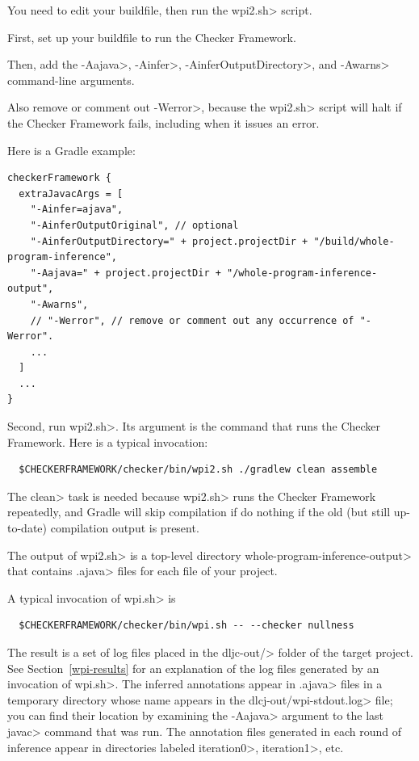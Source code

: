 You need to edit your buildfile, then run the \<wpi2.sh> script.



First, set up your buildfile to run the Checker Framework.

Then, add the
\<-Aajava>,
\<-Ainfer>,
\<-AinferOutputDirectory>, and
\<-Awarns> command-line arguments.

Also remove or comment out \<-Werror>, because the
\<wpi2.sh> script will halt if the Checker Framework fails, including when it
issues an error.

Here is a Gradle example:

\begin{Verbatim}
checkerFramework {
  extraJavacArgs = [
    "-Ainfer=ajava",
    "-AinferOutputOriginal", // optional
    "-AinferOutputDirectory=" + project.projectDir + "/build/whole-program-inference",
    "-Aajava=" + project.projectDir + "/whole-program-inference-output",
    "-Awarns",
    // "-Werror", // remove or comment out any occurrence of "-Werror".
    ...
  ]
  ...
}
\end{Verbatim}



Second, run \<wpi2.sh>.  Its argument is the command that runs the Checker Framework.
Here is a typical invocation:

\begin{Verbatim}
  $CHECKERFRAMEWORK/checker/bin/wpi2.sh ./gradlew clean assemble
\end{Verbatim}

The \<clean> task is needed because \<wpi2.sh> runs the Checker Framework
repeatedly, and Gradle will skip compilation if do nothing if the old (but still
up-to-date) compilation output is present.

The output of \<wpi2.sh> is a top-level directory
\<whole-program-inference-output> that contains \<.ajava> files for each file of
your project.



A typical invocation of \<wpi.sh> is

\begin{Verbatim}
  $CHECKERFRAMEWORK/checker/bin/wpi.sh -- --checker nullness
\end{Verbatim}

The result is a set of log files placed in the \<dljc-out/> folder of the
target project.
See Section~\ref{wpi-results} for an explanation of the log files generated by
an invocation of \<wpi.sh>.
The inferred annotations appear in \<.ajava> files in a
temporary directory whose name appears in the \<dlcj-out/wpi-stdout.log> file;
you can find their location by examining the \<-Aajava> argument
to the last \<javac> command that was run. The annotation files generated in
each round of inference appear in directories labeled \<iteration0>, \<iteration1>, etc.

